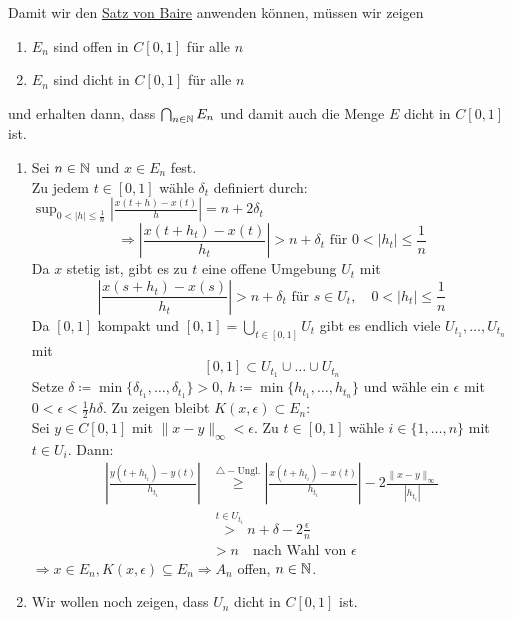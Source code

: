 \begin{beweis}
	Damit wir den \hyperref[satz:9.1-baire]{Satz von Baire} anwenden können, müssen wir zeigen 
	\begin{enumerate}[label=\roman*\upshape)]
		\item $E_{n}$ sind offen in $C[0, 1]$ für alle $n$
		\item $E_{n}$ sind dicht in $C[0, 1]$ für alle $n$
	\end{enumerate}
	und erhalten dann, dass $\bigcap_{n \in \mathbb{N}} E_{n}$ und damit auch die Menge $E$ dicht in $C[0, 1]$ ist. \\
	\begin{enumerate}[label=\roman*\upshape)]
		\item Sei $n \in \mathbb{N}$ und $x \in E_{n}$ fest. \\
			Zu jedem $t \in [0, 1]$ wähle $\delta_{t}$ definiert durch: $\sup_{0 < |h| \leq \frac{1}{n}} \left| \frac{x(t + h) - x(t)}{h} \right| = n + 2 \delta_{t}$
			\[ \Rightarrow \left| \frac{x(t + h_{t}) - x(t)}{h_{t}} \right| > n + \delta_{t} \text{ für } 0 < |h_{t}| \leq \frac{1}{n} \]
			Da $x$ stetig ist, gibt es zu $t$ eine offene Umgebung $U_{t}$ mit
			\[ \left| \frac{x(s + h_{t}) - x(s)}{h_{t}} \right| > n + \delta_{t} \text{ für } s \in U_{t}, \quad 0 < |h_{t}| \leq \frac{1}{n} \]
			Da $[0, 1]$ kompakt und $[0, 1] = \bigcup_{t \in [0, 1]} U_{t}$ gibt es endlich viele $U_{t_{1}}, \dotsc, U_{t_{n}}$ mit 
				\[ [0, 1] \subset U_{t_{1}} \cup \dotsc \cup U_{t_{n}} \]
			Setze $\delta \coloneqq \min \{ \delta_{t_{1}}, \dotsc, \delta_{t_{1}} \} > 0$, $h \coloneqq \min \{ h_{t_{1}}, \dotsc, h_{t_{n}} \}$ und wähle ein $\epsilon$ mit $0 < \epsilon < \frac{1}{2} h \delta$. Zu zeigen bleibt $K(x, \epsilon) \subset E_{n}$: \\ 
			Sei $y \in C[0, 1]$ mit $\| x - y \|_{\infty} < \epsilon$. Zu $t \in [0, 1]$ wähle $i \in \{ 1, \dotsc, n \}$ mit $t \in U_{i}$. Dann:
			\begin{align*}
				\left| \frac{y(t + h_{t_{i}}) - y(t)}{h_{t_{i}}} \right| & \overset{\triangle-\text{Ungl.}}{\geq} \left| \frac{x(t + h_{t_{i}}) - x(t)}{h_{t_{i}}} \right| - 2 \frac{\| x - y \|_{\infty}}{|h_{t_{i}}|} \\
				& \overset{t \in U_{t_{i}}}{>} n + \delta - 2 \frac{\epsilon}{n} \\
				& > n \quad \text{nach Wahl von } \epsilon
			\end{align*}
			$\Rightarrow x \in E_{n}, K(x, \epsilon) \subseteq E_{n} \Rightarrow A_{n}$ offen, $n \in \mathbb{N}$.
		\item Wir wollen noch zeigen, dass $U_{n}$ dicht in $C[0, 1]$ ist. \\

\end{enumerate}
\end{beweis}
